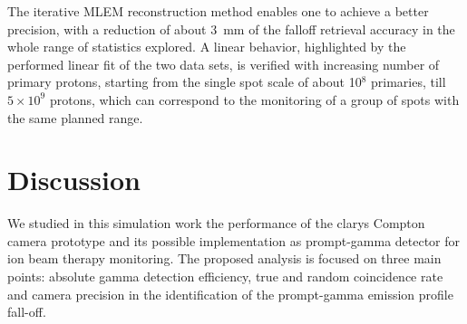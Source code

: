 The iterative MLEM reconstruction method enables one to achieve a better precision, with a reduction of about 3~mm of the falloff retrieval accuracy in the whole range of statistics explored. A linear behavior, highlighted by the performed linear fit of the two data sets, is verified with increasing number of primary protons, starting from the single spot scale of about 10$^8$ primaries, till $5\times10^9$ protons, which can correspond to the monitoring of a group of spots with the same planned range. 

\section{Discussion}

We studied in this simulation work the performance of the \gls{clarys} Compton camera prototype and its possible implementation as prompt-gamma detector for ion beam therapy monitoring. The proposed analysis is focused on three main points: absolute gamma detection efficiency, true and random coincidence rate and camera precision in the identification of the prompt-gamma emission profile fall-off.

